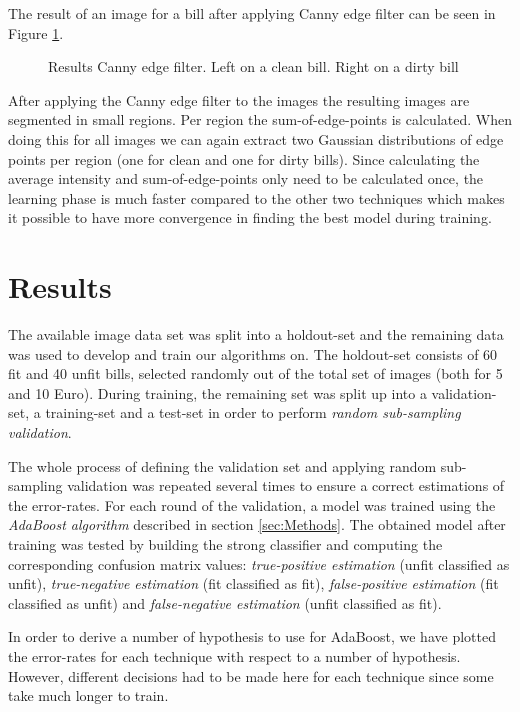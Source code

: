 \documentclass[11pt,twocolumn]{article}
\begin{document}
            The result of an image for a bill after applying Canny edge filter
            can be seen in Figure \ref{canny5Euro}.
            
            \begin{figure}[!hbtp]
				\centering 
				\caption{Results Canny edge filter. Left on a clean bill. Right on a dirty bill} 
				\label{canny5Euro} 
			\end{figure} 
			
			After applying the Canny edge filter to the images the resulting images are segmented in small regions. Per region the sum-of-edge-points is calculated. When doing this for all images we can again extract two Gaussian distributions of edge points per region (one for clean and one for dirty bills). Since calculating the average intensity and sum-of-edge-points only need to be calculated once, the learning phase is much faster compared to the other two techniques which makes it possible to have more convergence in finding the best model during training.
			
	\section{Results}\label{sec:results}
		The available image data set was split into a holdout-set and the remaining data was used to develop and train our algorithms on. The holdout-set consists of 60 fit and 40 unfit bills, selected randomly out of the total set of images (both for 5 and 10 Euro). During training, the remaining set was split up into a validation-set, a training-set and a test-set in order to perform \emph{random sub-sampling validation}.

		The whole process of defining the validation set and applying random sub-sampling validation was repeated several times to ensure a correct estimations of the error-rates. For each round of the validation, a model was trained using the \emph{AdaBoost algorithm} described in section \ref{sec:Methods}. The obtained model after training was tested by building the strong classifier and computing the corresponding confusion matrix values: \emph{true-positive estimation} (unfit classified as unfit), \emph{true-negative estimation} (fit classified as fit), \emph{false-positive estimation} (fit classified as unfit) and \emph{false-negative estimation} (unfit classified as fit).
		
		In order to derive a number of hypothesis to use for AdaBoost, we have plotted the error-rates for each technique with respect to a number of hypothesis. However, different decisions had to be made here for each technique since some take much longer to train.
\end{document}
